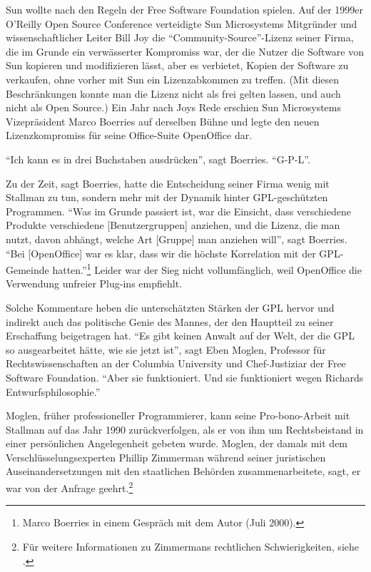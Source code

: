 Sun wollte nach den Regeln der Free Software Foundation spielen. Auf der 1999er O'Reilly Open Source Conference verteidigte Sun Microsystems Mitgründer und wissenschaftlicher Leiter Bill Joy die "`Community-Source"'-Lizenz seiner Firma, die im Grunde ein verwässerter Kompromiss war, der die Nutzer die Software von Sun kopieren und modifizieren lässt, aber es verbietet, Kopien der Software zu verkaufen, ohne vorher mit Sun ein Lizenzabkommen zu treffen. (Mit diesen Beschränkungen konnte man die Lizenz nicht als frei gelten lassen, und auch nicht als Open Source.) Ein Jahr nach Joys Rede erschien Sun Microsystems Vizepräsident Marco Boerries auf derselben Bühne und legte den neuen Lizenzkompromiss für seine Office-Suite OpenOffice dar. 

"`Ich kann es in drei Buchstaben ausdrücken"', sagt Boerries. "`G-P-L"'.

Zu der Zeit, sagt Boerries, hatte die Entscheidung seiner Firma wenig mit Stallman zu tun, sondern mehr mit der Dynamik hinter GPL-geschützten Programmen. "`Was im Grunde passiert ist, war die Einsicht, dass verschiedene Produkte verschiedene [Benutzergruppen] anziehen, und die Lizenz, die man nutzt, davon abhängt, welche Art [Gruppe] man anziehen will"', sagt Boerries. "`Bei [OpenOffice] war es klar, dass wir die höchste Korrelation mit der GPL-Gemeinde hatten."'\footnote{Marco Boerries in einem Gespräch mit dem Autor (Juli 2000).}  Leider war der Sieg nicht vollumfänglich, weil OpenOffice die Verwendung unfreier Plug-ins empfiehlt.

Solche Kommentare heben die unterschätzten Stärken der GPL hervor und indirekt auch das politische Genie des Mannes, der den Hauptteil zu seiner Erschaffung beigetragen hat. "`Es gibt keinen Anwalt auf der Welt, der die GPL so ausgearbeitet hätte, wie sie jetzt ist"', sagt Eben Moglen,  Professor für Rechtswissenschaften an der Columbia University und Chef-Justiziar der Free Software Foundation. "`Aber sie funktioniert. Und sie funktioniert wegen Richards Entwurfsphilosophie."'

Moglen, früher professioneller Programmierer, kann seine Pro-bono-Arbeit mit Stallman auf das Jahr 1990 zurückverfolgen, als er von ihm um Rechtsbeistand in einer persönlichen Angelegenheit gebeten wurde. Moglen, der damals mit dem Verschlüsselungsexperten Phillip Zimmerman während seiner juristischen Auseinandersetzungen mit den staatlichen Behörden zusammenarbeitete, sagt, er war von der Anfrage geehrt.\footnote{Für weitere Informationen zu Zimmermans rechtlichen Schwierigkeiten, siehe \cite[][S.\,287f]{crypto}. }

